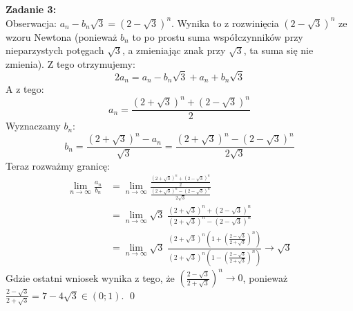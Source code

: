 \documentclass[10pt]{article}
\begin{document}
\textbf{Zadanie 3:} \\[10pt]
Obserwacja: $a_n - b_n \sqrt{3} = (2 - \sqrt{3})^n$. Wynika to z rozwinięcia $(2 - \sqrt{3})^n$ ze wzoru Newtona (ponieważ $b_n$ to po prostu suma współczynników przy nieparzystych potęgach $\sqrt{3}$, a zmieniając znak przy $\sqrt{3}$, ta suma się nie zmienia). Z tego otrzymujemy:
$$2a_n = a_n - b_n\sqrt{3} + a_n + b_n\sqrt{3}$$
A z tego:
$$a_n = \frac{(2+\sqrt{3})^n + (2 - \sqrt{3})^n}{2}$$
Wyznaczamy $b_n$:
$$b_n = \frac{(2+\sqrt{3})^n - a_n}{\sqrt{3}} = \frac{(2+\sqrt{3})^n - (2 - \sqrt{3})^n}{2\sqrt{3}}$$
Teraz rozważmy granicę:
\begin{align*}
    \lim_{n \to \infty} \frac{a_n}{b_n} &= \lim_{n \to \infty} \frac{\frac{(2+\sqrt{3})^n + (2 - \sqrt{3})^n}{2}}{\frac{(2+\sqrt{3})^n - (2 - \sqrt{3})^n}{2\sqrt{3}}} \\
    &= \lim_{n \to \infty} \sqrt{3} \; \frac{(2+\sqrt{3})^n + (2 - \sqrt{3})^n}{(2+\sqrt{3})^n - (2 - \sqrt{3})^n} \\
    &= \lim_{n \to \infty} \sqrt{3} \; \frac{(2+\sqrt{3})^n \left( 1 + \left(\frac{2 - \sqrt{3}}{2+\sqrt{3}}\right)^n\right)}{(2+\sqrt{3})^n \left(1 - \left(\frac{2 - \sqrt{3}}{2+\sqrt{3}}\right)^n\right)} \to \sqrt{3}
\end{align*}
Gdzie ostatni wniosek wynika z tego, że $\left(\frac{2 - \sqrt{3}}{2+\sqrt{3}}\right)^n \to 0$, ponieważ $\frac{2 - \sqrt{3}}{2+\sqrt{3}} = 7 - 4\sqrt{3} \in (0; 1)$. \qed
\end{document}

